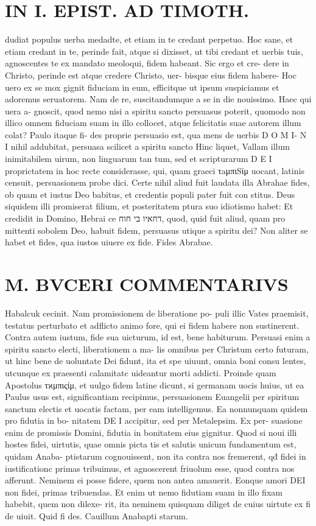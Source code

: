 \documentclass{article}
\begin{document}
\begin{pages}
\section*{IN I. EPIST. AD TIMOTH. }\pstart dudiat populus uerba medadte, et etiam in te credant perpetuo. Hoc sane, et etiam credant in te, perinde fait, atque si dixisset, ut tibi credant et uerbis tuis, agnoscentes te ex mandato meoloqui, fidem habeant. Sic ergo et cre- dere in Christo, perinde est atque credere Christo, uer- bisque eius fidem habere-  \pend\pstart Hoc uero ex se mox gignit fiduciam in eum, efficitque ut ipsum suspiciamus et adoremus seruatorem. Nam de re, suscitandumque a se in die nouissimo. Haec qui uera a- gnoscit, quod nemo nisi a spiritu sancto persuasus poterit, quomodo non illico omnem fiduciam suam in illo collocet, atque felicitatis suae autorem illum colat? Paulo itaque fi- des proprie persuasio est, qua mens de uerbis D O M I- N I nihil addubitat, persuasa scilicet a spiritu sancto Hinc liquet, Vallam illum inimitabilem uirum, non linguarum tan tum, sed et scripturarum D E I proprictatem in hoc recte considerasse, qui, quam graeci τaμπιSίμ uocant, latinis censuit, persuasionem probe dici.  \pend\pstart Certe nihil aliud fuit laudata illa Abrahae fides, ob quam et iustus Deo babitus, et credentis populi pater fuit con stitus.  Deus siquidem illi promiserat filium, et posteritatem ptura suo idiotismo habet: Et credidit in Domino, Hebrai ce דחאיו בי חוח, quod, quid fuit aliud, quam pro mittenti sobolem Deo, habuit fidem, persuasus utique a spiritu dei? Non aliter se habet et fides, qua iustos uiuere  \pendFidutia ex fide.  Fides Abrabae.  
\section*{M. BVCERI COMMENTARIVS }
\marginpar{[ p.20 ]}\pstart Habalcuk cecinit.  Nam promissionem de liberatione po- puli illic Vates praemisit, testatus perturbato et adflicto animo fore, qui ei fidem habere non sustinerent. Contra autem iustum, fide sua uicturum, id est, bene habiturum.  Persuasi enim a spiritu sancto electi, liberationem a ma- lis omnibus per Christum certo futuram, ut hinc bene de uoluntate Dei fidunt, ita et spe uiuunt, omnia boni consu lentes, utcunque ex praesenti calamitatc uideantur morti addicti.   \pend\pstart Proinde quam Apostolus τϰμπιςίμ, et uulgo fidem latine dicunt, si germanam uocis huius, ut ea Paulus usus est, significantiam recipimus, persuasionem Euangelii per spiritum sanctum electis et uocatis factam, per eam intelligemus. Ea nonnunquam quidem pro fidutia in bo-  nitatem DE I accipitur, sed per Metalepsim.  Ex per- suasione enim de promissis Domini, fidutia in bonitatem eius gignitur.  \pend\pstart Quod si noui illi hostes fidei, uirtutis, quae omnis picta tis et salutis unicum fundamentum est, quidam Anaba- ptistarum cognouissent, non ita contra nos fremerent, qđ fidei in iustificationc primas tribuimus, et agnoscerent friuolum esse, quod contra nos afferunt.  Neminem ei posse fidere, quem non antea amauerit.  Eonque amori DEI non fidei, primas tribuendas.  Et enim ut nemo fidutiam suam in illo fixam habebit, quem non dilexe- rit, ita neminem quisquam diliget de cuius uirtute  \pendIustus ex fi de uiuit.  Quid fi des.  Cauillum Anabapti starum.  

\end{pages}
\end{document}
